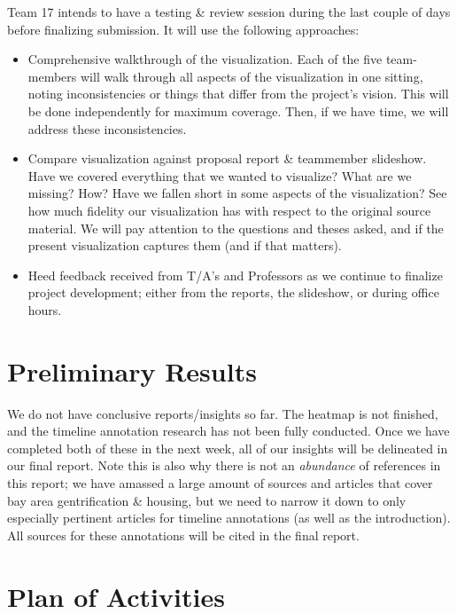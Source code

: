 \documentclass{article}
\begin{document}
Team 17 intends to have a testing \& review session during the last couple of days before finalizing submission. It will use the following approaches:

\begin{itemize}

    \item Comprehensive walkthrough of the visualization. Each of the five team-members will walk through all aspects of the visualization in one sitting, noting inconsistencies or things that differ from the project's vision. This will be done independently for maximum coverage. Then, if we have time, we will address these inconsistencies. 

    \item Compare visualization against proposal report \& teammember slideshow. Have we covered everything that we wanted to visualize? What are we missing? How? Have we fallen short in some aspects of the visualization? See how much fidelity our visualization has with respect to the original source material. We will pay attention to the questions and theses asked, and if the present visualization captures them (and if that matters).

    \item Heed feedback received from T/A's and Professors as we continue to finalize project development; either from the reports, the slideshow, or during office hours.
    
\end{itemize}



\section{Preliminary Results}

We do not have conclusive reports/insights so far. The heatmap is not finished, and the timeline annotation research has not been fully conducted. Once we have completed both of these in the next week, all of our insights will be delineated in our final report. Note this is also why there is not an \textit{abundance} of references in this report; we have amassed a large amount of sources and articles that cover bay area gentrification \& housing, but we need to narrow it down to only especially pertinent articles for timeline annotations (as well as the introduction). All sources for these annotations will be cited in the final report. 

\section{Plan of Activities}
\end{document}
